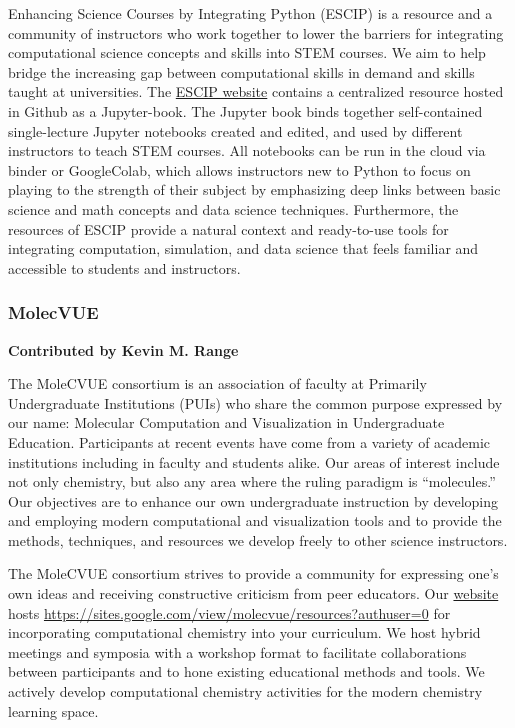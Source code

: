 \documentclass[9pt,review]{livecoms}
\begin{document}
Enhancing Science Courses by Integrating Python (ESCIP) is a resource and a community of instructors who work together to lower the barriers for integrating computational science concepts and skills into STEM courses. 
We aim to help bridge the increasing gap between computational skills in demand and skills taught at universities. 
The \href{https://escip.github.io/}{ESCIP website} contains a centralized resource hosted in Github as a Jupyter-book. 
The Jupyter book binds together self-contained single-lecture Jupyter notebooks created and edited, and used by different instructors to teach STEM courses. 
All notebooks can be run in the cloud via binder or GoogleColab, which allows instructors new to Python to focus on playing to the strength of their subject by emphasizing deep links between basic science and math concepts and data science techniques. 
Furthermore, the resources of ESCIP provide a natural context and ready-to-use tools for integrating computation, simulation, and data science that feels familiar and accessible to students and instructors.


\subsubsection{MolecVUE}

\textbf{Contributed by Kevin M. Range}

The MoleCVUE consortium is an association of faculty at Primarily Undergraduate Institutions (PUIs) who share the common purpose expressed by our name: Molecular Computation and Visualization in Undergraduate Education. 
Participants at recent events have come from a variety of academic institutions including in faculty and students alike. 
Our areas of interest include not only chemistry, but also any area where the ruling paradigm is “molecules.” 
Our objectives are to enhance our own undergraduate instruction by developing and employing modern computational and visualization tools and to provide the methods, techniques, and resources we develop freely to other science instructors.

The MoleCVUE consortium strives to provide a community for expressing one’s own ideas and receiving constructive criticism from peer educators. Our \href{https://sites.google.com/view/molecvue/events?authuser=0}{website} hosts \href{curated resources}{https://sites.google.com/view/molecvue/resources?authuser=0} for incorporating computational chemistry into your curriculum. We host hybrid meetings and symposia with a workshop format to facilitate collaborations between participants and to hone existing educational methods and tools. We actively develop computational chemistry activities for the modern chemistry learning space.
\end{document}
